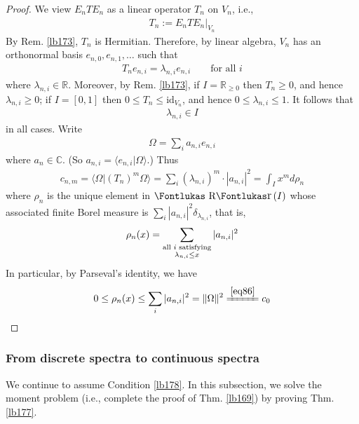 \documentclass[12pt,b5paper,notitlepage]{article}
\theoremstyle{definition}
\theoremstyle{plain}
\DeclareMathOperator{\Rr}{\text{\Fontlukas R}\text{\kern -0pt {\Fontlukas\large r}}\,}
\newcommand{\id}{\mathrm{id}}
\newcommand{\bk}[1]{\langle {#1}\rangle}
\newcommand{\Cbb}{\mathbb C}
\newcommand{\Rbb}{\mathbb R}
\numberwithin{equation}{section}
\begin{document}
\begin{proof}
We view $E_nTE_n$ as a linear operator $T_n$ on $V_n$, i.e.,
\begin{align}\label{eq120}
T_n:=E_nTE_n\big|_{V_n}
\end{align}
By Rem. \ref{lb173}, $T_n$ is Hermitian. Therefore, by linear algebra, $V_n$ has an orthonormal basis $e_{n,0},e_{n,1},\dots$ such that
\begin{align}
T_ne_{n,i}=\lambda_{n,i}e_{n,i}\qquad\text{for all }i
\end{align}
where $\lambda_{n,i}\in\Rbb$. Moreover, by Rem. \ref{lb173}, if $I=\Rbb_{\geq0}$ then $T_n\geq0$, and hence $\lambda_{n,i}\geq0$; if $I=[0,1]$ then $0\leq T_n\leq\id_{V_n}$, and hence $0\leq\lambda_{n,i}\leq 1$. It follows that
\begin{align*}
\lambda_{n,i}\in I
\end{align*}
in all cases. Write
\begin{align}
\Omega=\sum_i a_{n,i}e_{n,i}
\end{align}
where $a_n\in\Cbb$. (So $a_{n,i}=\bk{e_{n,i}|\Omega}$.) Thus
\begin{align*}
c_{n,m}=\bk{\Omega|(T_n)^m\Omega}=\sum_i (\lambda_{n,i})^m\cdot |a_{n,i}|^2=\int_I x^md\rho_n
\end{align*}
where $\rho_n$ is the unique element in $\Rr(I)$ whose associated finite Borel measure is $\sum_i|a_{n,i}|^2\delta_{\lambda_{n,i}}$, that is,
\begin{align}\label{eq119}
\rho_n(x)=\sum_{
\begin{subarray}{c}
\text{all $i$ satisfying}\\
\lambda_{n,i}\leq x
\end{subarray}
}|a_{n,i}|^2
\end{align}
In particular, by Parseval's identity, we have
\begin{align*}
0\leq \rho_n(x)\leq\sum_i |a_{n,i}|^2=\Vert\Omega\Vert^2\xlongequal{\eqref{eq86}}c_0
\end{align*}
\end{proof}




\subsubsection{From discrete spectra to continuous spectra}\label{lb205}


We continue to assume Condition \ref{lb178}. In this subsection, we solve the moment problem (i.e., complete the proof of Thm. \ref{lb169}) by proving Thm. \ref{lb177}.
\end{document}
